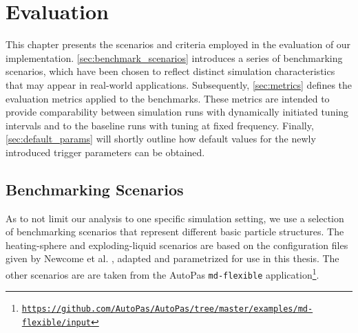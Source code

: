 \chapter[Evaluation]{Evaluation}
\label{cp:evaluation}

{
	\parindent0pt
	This chapter presents the scenarios and criteria employed in the evaluation of our implementation. \autoref{sec:benchmark_scenarios} introduces a series of benchmarking scenarios, which have been chosen to reflect distinct simulation characteristics that may appear in real-world applications. Subsequently, \autoref{sec:metrics} defines the evaluation metrics applied to the benchmarks. These metrics are intended to provide comparability between simulation runs with dynamically initiated tuning intervals and to the baseline runs with tuning at fixed frequency.
	Finally, \autoref{sec:default_params} will shortly outline how default values for the newly introduced trigger parameters can be obtained.
}


\section{Benchmarking Scenarios}
\label{sec:benchmark_scenarios}
As to not limit our analysis to one specific simulation setting, we use a selection of benchmarking scenarios that represent different basic particle structures.
The heating-sphere and exploding-liquid scenarios are based on the configuration files given by Newcome et al.  \cite{Newcome2025}, adapted and parametrized for use in this thesis.
The other scenarios are are taken from the AutoPas \texttt{md-flexible} application\footnote{\href{https://github.com/AutoPas/AutoPas/tree/master/examples/md-flexible/input}{\texttt{https://github.com/AutoPas/AutoPas/tree/master/examples/md-flexible/input}}}.



\newcommand{\fastcolorbar}{%
	\centering
	\begin{tikzpicture}
		\pgfplotscolorbardrawstandalone[
			colorbar,
			colormap name=fast,
			point meta min=0,
			point meta max=50,
			colorbar style={
					height=3cm,
					ytick={0,10,...,50},
					tick align=outside,
					tick pos=right,
				},
		]
	\end{tikzpicture}

	\begin{tikzpicture}
		\node[anchor=north, align=center] at (0,0) {\si{F^{*}}};
	\end{tikzpicture}
}

